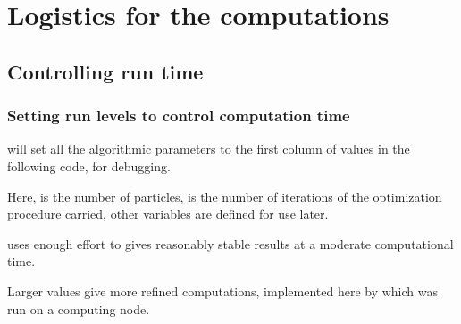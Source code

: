 \section{Logistics for the computations}

\subsection*{Controlling run time}

\begin{frame}[fragile]

\frametitle{Setting run levels to control computation time}

\bi

\item {} will set all the algorithmic parameters to the first column of values in the following code, for debugging.

\item Here,  is the number of particles,  is the number of iterations of the optimization procedure carried, other variables are defined for use later.

\item {} uses enough effort to gives reasonably stable results at a moderate computational time.

\item Larger values give more refined computations, implemented here by  which was run on a computing node.

\ei

\begin{knitrout}\small
{}\color{fgcolor}\begin{kframe}
\begin{alltt}
 \hlkwb{<-} 
 \hlkwb{<-}          \hlstd{,} \hlstd{,} \hlstd{)}
 \hlkwb{<-}         \hlstd{,} \hlstd{,} \hlstd{)}
 \hlkwb{<-}    \hlstd{,}  \hlstd{,}  \hlstd{)}
 \hlkwb{<-}  \hlstd{,}  \hlstd{,}  \hlstd{)}
 \hlkwb{<-} \hlstd{,}  \hlstd{,} \hlstd{)}
 \hlkwb{<-}         \hlstd{,} \hlstd{,} \hlstd{)}
\end{alltt}
\end{kframe}
\end{knitrout}

\end{frame}

